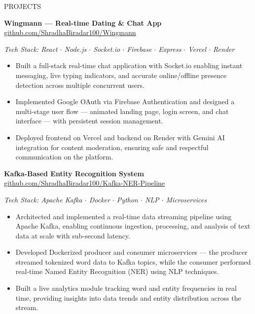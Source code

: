 \documentclass{resume}
\begin{document}
\begin{rSection}{PROJECTS}

\textbf{\textcolor{myblue}{Wingmann --- Real-time Dating \& Chat App}}
\hfill \href{https://github.com/ShradhaBiradar100/Wingmann}{github.com/ShradhaBiradar100/Wingmann}

\textit{Tech Stack: React $\cdot$ Node.js $\cdot$ Socket.io $\cdot$ Firebase $\cdot$ Express $\cdot$ Vercel $\cdot$ Render}

\begin{itemize}
\itemsep -3pt
\parsep 0pt
\partopsep 0pt
\topsep 2pt

\item Built a full-stack real-time chat application with Socket.io enabling instant messaging, live typing indicators, and accurate online/offline presence detection across multiple concurrent users.

\item Implemented Google OAuth via Firebase Authentication and designed a multi-stage user flow --- animated landing page, login screen, and chat interface --- with persistent session management.

\item Deployed frontend on Vercel and backend on Render with Gemini AI integration for content moderation, ensuring safe and respectful communication on the platform.

\end{itemize}

\textbf{\textcolor{myblue}{Kafka-Based Entity Recognition System}}
\hfill \href{https://github.com/ShradhaBiradar100/Kafka-NER-Pipeline}{github.com/ShradhaBiradar100/Kafka-NER-Pipeline}

\textit{Tech Stack: Apache Kafka $\cdot$ Docker $\cdot$ Python $\cdot$ NLP $\cdot$ Microservices}

\begin{itemize}
\itemsep -3pt
\parsep 0pt
\partopsep 0pt
\topsep 2pt

\item Architected and implemented a real-time data streaming pipeline using Apache Kafka, enabling continuous ingestion, processing, and analysis of text data at scale with sub-second latency.

\item Developed Dockerized producer and consumer microservices --- the producer streamed tokenized word data to Kafka topics, while the consumer performed real-time Named Entity Recognition (NER) using NLP techniques.

\item Built a live analytics module tracking word and entity frequencies in real time, providing insights into data trends and entity distribution across the stream.

\end{itemize}

\end{rSection}
\end{document}
